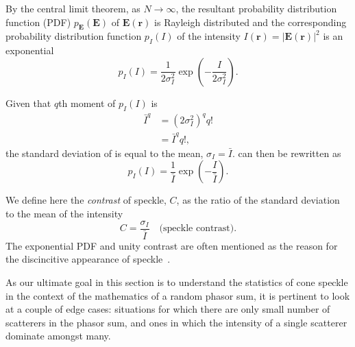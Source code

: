 By the central limit theorem, as $N\to\infty$, the resultant probability
distribution function (PDF) $p_\mathbf{E}(\mathbf{E})$ of $\mathbf{E}(\mathbf{r})$ is Rayleigh distributed and the
corresponding probability distribution function $p_I(I)$ of the intensity
$I(\mathbf{r})=|\mathbf{E}(\mathbf{r})|^2$ is an exponential
\begin{equation}
p_I(I) = \frac{1}{2\sigma_I^2}\exp\left(-\frac{I}{2\sigma_I^2}\right).
\label{eqn:propexp}
\end{equation}

Given that $q$th moment of $p_I(I)$ is 
\begin{align}
\bar{I}^q&=(2\sigma_I^2)^q q!\\
         &=\bar{I}^q q!,
\end{align}
the standard deviation of is equal to the mean,
$\sigma_I=\bar{I}$.   can then be rewritten as
\begin{equation}
p_I(I) = \frac{1}{\bar{I}}\exp\left(-\frac{I}{\bar{I}}\right).
\label{eqn:exppdf}
\end{equation}

We define here the \textit{contrast} of speckle, $C$, as the
ratio of the standard deviation to the mean of the intensity
\begin{equation}
C=\frac{\sigma_I}{\bar{I}}\quad\text{(speckle contrast)}.
\label{eqn:specklecontrast}
\end{equation}
The exponential PDF and unity contrast are often mentioned as the reason
for the discincitive appearance of speckle~\cite{goodman2007speckle}.

As our ultimate goal in this section is to understand the statistics of cone
speckle in the context of the mathematics of a random phasor sum, it
is pertinent to look at a couple of edge cases: situations for which
there are only small number of scatterers in the phasor sum, and ones in
which the intensity of a single scatterer dominate amongst many.
